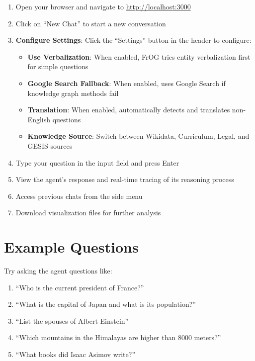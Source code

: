 \begin{enumerate}
    \item Open your browser and navigate to \url{http://localhost:3000}
    \item Click on ``New Chat'' to start a new conversation
    \item \textbf{Configure Settings}: Click the ``Settings'' button in the header to configure:
    \begin{itemize}
        \item \textbf{Use Verbalization}: When enabled, FrOG tries entity verbalization first for simple questions
        \item \textbf{Google Search Fallback}: When enabled, uses Google Search if knowledge graph methods fail
        \item \textbf{Translation}: When enabled, automatically detects and translates non-English questions
        \item \textbf{Knowledge Source}: Switch between Wikidata, Curriculum, Legal, and GESIS sources
    \end{itemize}
    \item Type your question in the input field and press Enter
    \item View the agent's response and real-time tracing of its reasoning process
    \item Access previous chats from the side menu
    \item Download visualization files for further analysis
\end{enumerate}

\section*{Example Questions}

Try asking the agent questions like:

\begin{enumerate}
    \item ``Who is the current president of France?''
    \item ``What is the capital of Japan and what is its population?''
    \item ``List the spouses of Albert Einstein''
    \item ``Which mountains in the Himalayas are higher than 8000 meters?''
    \item ``What books did Isaac Asimov write?''
\end{enumerate}

